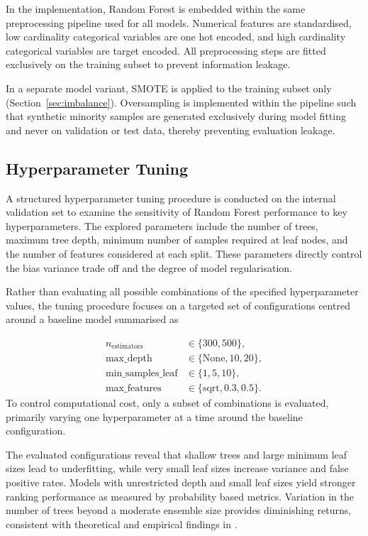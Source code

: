\documentclass[oneside,12pt,parskip=half,american,numbers=noenddot]{scrreprt}
\begin{document}
In the implementation, Random Forest is embedded within the same preprocessing pipeline used for all models. Numerical features are standardised, low cardinality categorical variables are one hot encoded, and high cardinality categorical variables are target encoded. All preprocessing steps are fitted exclusively on the training subset to prevent information leakage.

In a separate model variant, SMOTE is applied to the training subset only (Section~\ref{sec:imbalance}). Oversampling is implemented within the pipeline such that synthetic minority samples are generated exclusively during model fitting and never on validation or test data, thereby preventing evaluation leakage.


\subsection{Hyperparameter Tuning}
A structured hyperparameter tuning procedure is conducted on the internal validation set to examine the sensitivity of Random Forest performance to key hyperparameters. The explored parameters include the number of trees, maximum tree depth, minimum number of samples required at leaf nodes, and the number of features considered at each split. These parameters directly control the bias variance trade off and the degree of model regularisation.

Rather than evaluating all possible combinations of the specified hyperparameter values, the tuning procedure focuses on a targeted set of configurations centred around a baseline model summarised as

\[
\begin{aligned}
n_{\text{estimators}} &\in \{300, 500\},\\
\text{max\_depth} &\in \{\text{None}, 10, 20\},\\
\text{min\_samples\_leaf} &\in \{1, 5, 10\},\\
\text{max\_features} &\in \{\text{sqrt}, 0.3, 0.5\}.
\end{aligned}
\]
To control computational cost, only a subset of combinations is evaluated, primarily varying one hyperparameter at a time around the baseline configuration.

The evaluated configurations reveal that shallow trees and large minimum leaf sizes lead to underfitting, while very small leaf sizes increase variance and false positive rates. Models with unrestricted depth and small leaf sizes yield stronger ranking performance as measured by probability based metrics. Variation in the number of trees beyond a moderate ensemble size provides diminishing returns, consistent with theoretical and empirical findings in \textcite{breiman_random_2001}.
\end{document}
